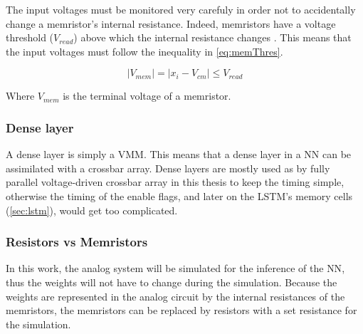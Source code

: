The input voltages must be monitored very carefuly in order not to accidentally change a memristor's internal resistance. Indeed, memristors have a voltage threshold ($V_{read}$) above which the internal resistance changes \cite{memristorSpiceModels,memCadenceModel,memTEAMmodel,memVTEAMmodel}. This means that the input voltages must follow the inequality in \cref{eq:memThres}.

\begin{equation}\label{eq:memThres}
  |V_{mem}|= |x_i-V_{cm}|\le V_{read}
\end{equation}

Where $V_{mem}$ is the terminal voltage of a memristor.

\subsubsection{Dense layer}

A dense layer is simply a \ac{VMM}. This means that a dense layer in a \ac{NN} can be assimilated with a crossbar array. Dense layers are mostly used as by fully parallel voltage-driven crossbar array in this thesis to keep the timing simple, otherwise the timing of the enable flags, and later on the \ac{LSTM}'s memory cells (\cref{sec:lstm}), would get too complicated.

\subsubsection{Resistors vs Memristors}

In this work, the analog system will be simulated for the inference of the \ac{NN}, thus the weights will not have to change during the simulation. Because the weights are represented in the analog circuit by the internal resistances of the memristors, the memristors can be replaced by resistors with a set resistance for the simulation.
